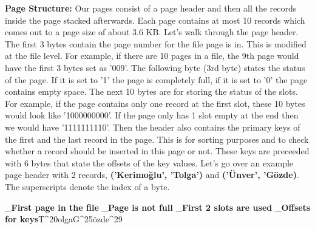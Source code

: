 \documentclass{article}
\begin{document}
\textbf{Page Structure:}
Our pages consist of a page header and then all the records inside the page stacked afterwards. Each page contains at most 10 records which comes out to a page size of about 3.6 KB. Let's walk through the page header. The first 3 bytes contain the page number for the file page is in. This is modified at the file level. For example, if there are 10 pages in a file, the 9th page would have the first 3 bytes set as '009'. The following byte (3rd byte) states the status of the page. If it is set to '1' the page is completely full, if it is set to '0' the page contains empty space. The next 10 bytes are for storing the status of the slots. For example, if the page contains only one record at the first slot, these 10 bytes would look like '1000000000'. If the page only has 1 slot empty at the end then we would have '1111111110'. Then the header also  contains the primary keys of the first and the last record in the page. This is for sorting purposes and to check whether a record should be inserted in this page or not. These keys are preceeded with 6 bytes that state the offsets of the key values. Let's go over an example page header with 2 records, \textbf{('Kerimoğlu', 'Tolga')} and \textbf{('Ünver', 'Gözde)}. The superscripts denote the index of a byte.

\begin{center}
    _\textbf{First page in the file        }_\textbf{Page is not full        }_\textbf{First 2 slots are used   }_\textbf{Offsets for keys}T^{20}olgaG^{25}özde^{29}
\end{center}
\newline \newline
\end{document}
